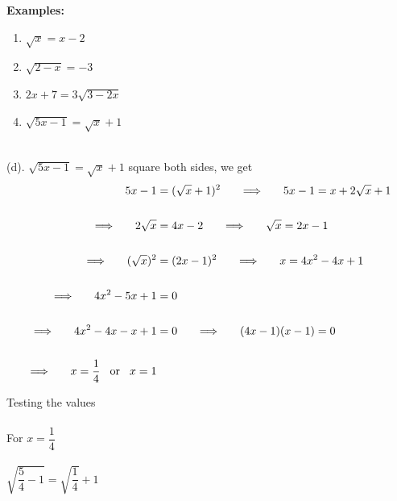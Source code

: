 \documentclass[11pt,a4paper]{article}
\begin{document}
\textbf{Examples:}
\begin{enumerate}
\item[(a).] $\sqrt{x}=x-2$
\item[(b).] $\sqrt{2-x}=-3$
\item[(c).] $2x+7=3\sqrt{3-2x}$
\item[(d).] $\sqrt{5x-1}=\sqrt{x}+1$\\\\
\end{enumerate}


(d). $\sqrt{5x-1}=\sqrt{x}+1$ square both sides, we get
\begin{align*}
5x-1 & = (\sqrt{x}+1)^2\hspace{0.5cm} \implies \hspace{0.5cm} 5x-1=x+2\sqrt{x} +1\\\\
\implies \hspace{0.5cm} 2\sqrt{x} & = 4x-2\hspace{0.5cm} \implies \hspace{0.5cm} \sqrt{x} = 2x-1\\\\
\implies \hspace{0.5cm} (\sqrt{x})^2 & = (2x-1)^2\hspace{0.5cm} \implies \hspace{0.5cm} x = 4x^2-4x+1\\\\
\implies \hspace{0.5cm} 4x^2-5x+1 &=0\\\\
\implies \hspace{0.5cm} 4x^2-4x-x+1 & = 0\hspace{0.5cm} \implies \hspace{0.5cm} (4x-1)(x-1)=0 \\\\
\implies \hspace{0.5cm} x=\frac{1}{4}\hspace{0.3cm} \text{or} \hspace{0.3cm} x=1\\
\end{align*}


Testing the values\\\\

For $x=\dfrac{1}{4}$\\\\
$\sqrt{\dfrac{5}{4}-1}=\sqrt{\dfrac{1}{4}}+1$\\\\
\end{document}
